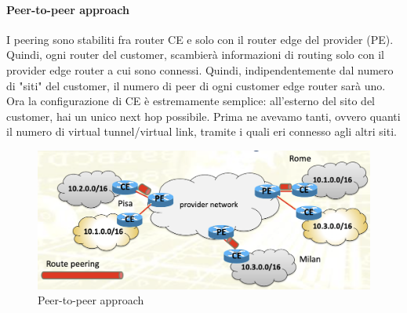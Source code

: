 \documentclass{article}
\begin{document}
\paragraph{Peer-to-peer approach} I peering sono stabiliti fra router CE e solo con il router edge del provider (PE). Quindi, ogni router del customer, scambierà informazioni di routing solo con il provider edge router a cui sono connessi. Quindi, indipendentemente dal numero di "siti" del customer, il numero di peer di ogni customer edge router sarà uno. Ora la configurazione di CE è estremamente semplice: all'esterno del sito del customer, hai un unico next hop possibile. Prima ne avevamo tanti, ovvero quanti il numero di virtual tunnel/virtual link, tramite i quali eri connesso agli altri siti. 
\begin{figure}[H]
    \centering
    \includegraphics[scale=0.5]{figures/peer-to-peer approach.png}
    \caption{Peer-to-peer approach}\label{figura:peer}
\end{figure}
\end{document}
